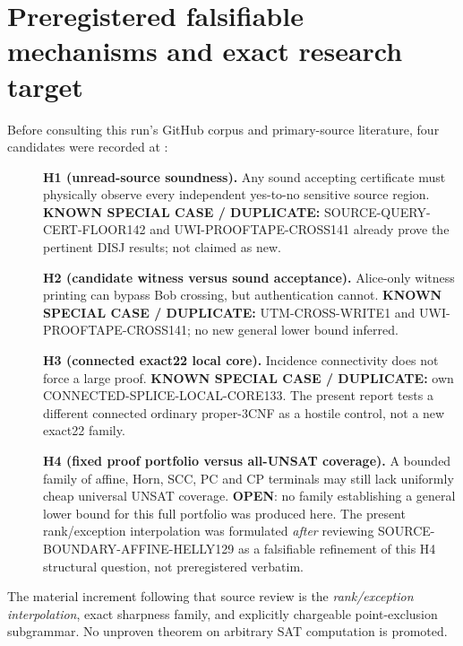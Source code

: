 \documentclass[11pt]{article}
\begin{document}
\section{Preregistered falsifiable mechanisms and exact research target}
Before consulting this run's GitHub corpus and primary-source literature, four candidates were recorded at
:
\begin{description}
\item[] \textbf{H1 (unread-source soundness).} Any sound accepting certificate must physically observe every independent yes-to-no sensitive source region. \textbf{KNOWN SPECIAL CASE / DUPLICATE:} SOURCE-QUERY-CERT-FLOOR142 and UWI-PROOFTAPE-CROSS141 already prove the pertinent DISJ results; not claimed as new.
\item[] \textbf{H2 (candidate witness versus sound acceptance).} Alice-only witness printing can bypass Bob crossing, but authentication cannot. \textbf{KNOWN SPECIAL CASE / DUPLICATE:} UTM-CROSS-WRITE1 and UWI-PROOFTAPE-CROSS141; no new general lower bound inferred.
\item[] \textbf{H3 (connected exact22 local core).} Incidence connectivity does not force a large proof. \textbf{KNOWN SPECIAL CASE / DUPLICATE:} own CONNECTED-SPLICE-LOCAL-CORE133. The present report tests a different connected ordinary proper-3CNF as a hostile control, not a new exact22 family.
\item[] \textbf{H4 (fixed proof portfolio versus all-UNSAT coverage).} A bounded family of affine, Horn, SCC, PC and CP terminals may still lack uniformly cheap universal UNSAT coverage. \textbf{OPEN}: no family establishing a general lower bound for this full portfolio was produced here. The present rank/exception interpolation was formulated \emph{after} reviewing SOURCE-BOUNDARY-AFFINE-HELLY129 as a falsifiable refinement of this H4 structural question, not preregistered verbatim.
\end{description}
The material increment following that source review is the \emph{rank/exception interpolation}, exact sharpness family, and explicitly chargeable point-exclusion subgrammar. No unproven theorem on arbitrary SAT computation is promoted.
\end{document}
